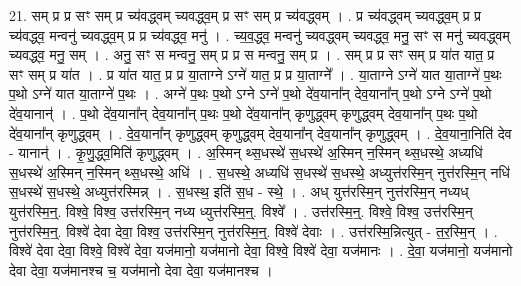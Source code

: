 \documentclass[17pt]{extarticle}
\begin{document}
21. सम् प्र प्र सꣳ सम् प्र च्य॑वद्ध्वम् च्यवद्ध्व॒म् प्र सꣳ सम् प्र च्य॑वद्ध्वम् । . प्र च्य॑वद्ध्वम् च्यवद्ध्व॒म् प्र प्र च्य॑वद्ध्व॒ मन्वनु॑ च्यवद्ध्व॒म् प्र प्र च्य॑वद्ध्व॒ मनु॑ । . च्य॒व॒द्ध्व॒ मन्वनु॑ च्यवद्ध्वम् च्यवद्ध्व॒ मनु॒ सꣳ स मनु॑ च्यवद्ध्वम् च्यवद्ध्व॒ मनु॒ सम् । . अनु॒ सꣳ स मन्वनु॒ सम् प्र प्र स मन्वनु॒ सम् प्र । . सम् प्र प्र सꣳ सम् प्र या॑त यात॒ प्र सꣳ सम् प्र या॑त । . प्र या॑त यात॒ प्र प्र या॒ताग्ने ऽग्ने॑ यात॒ प्र प्र या॒ताग्ने᳚ । . या॒ताग्ने ऽग्ने॑ यात या॒ताग्ने॑ प॒थः प॒थो ऽग्ने॑ यात या॒ताग्ने॑ प॒थः । . अग्ने॑ प॒थः प॒थो ऽग्ने ऽग्ने॑ प॒थो दे॑व॒याना᳚न् देव॒याना᳚न् प॒थो ऽग्ने ऽग्ने॑ प॒थो दे॑व॒यानान्॑ । . प॒थो दे॑व॒याना᳚न् देव॒याना᳚न् प॒थः प॒थो दे॑व॒याना᳚न् कृणुद्ध्वम् कृणुद्ध्वम् देव॒याना᳚न् प॒थः प॒थो दे॑व॒याना᳚न् कृणुद्ध्वम् । . दे॒व॒याना᳚न् कृणुद्ध्वम् कृणुद्ध्वम् देव॒याना᳚न् देव॒याना᳚न् कृणुद्ध्वम् । . दे॒व॒याना॒निति॑ देव - यानान्॑ । . कृ॒णु॒द्ध्व॒मिति॑ कृणुद्ध्वम् । . अ॒स्मिन् थ्स॒धस्थे॑ स॒धस्थे॑ अ॒स्मिन् न॒स्मिन् थ्स॒धस्थे॒ अध्यधि॑ स॒धस्थे॑ अ॒स्मिन् न॒स्मिन् थ्स॒धस्थे॒ अधि॑ । . स॒धस्थे॒ अध्यधि॑ स॒धस्थे॑ स॒धस्थे॒ अध्युत्त॑रस्मि॒न् नुत्त॑रस्मि॒न् नधि॑ स॒धस्थे॑ स॒धस्थे॒ 
अध्युत्त॑रस्मिन्न् । . स॒धस्थ॒ इति॑ स॒ध - स्थे॒ । . अध् युत्त॑रस्मि॒न् नुत्त॑रस्मि॒न् नध्यध् युत्त॑रस्मि॒न्॒. विश्वे॒ विश्व॒ उत्त॑रस्मि॒न् नध्य ध्युत्त॑रस्मि॒न्॒. विश्वे᳚ । . उत्त॑रस्मि॒न्॒. विश्वे॒ विश्व॒ उत्त॑रस्मि॒न् नुत्त॑रस्मि॒न्॒. विश्वे॑ देवा देवा॒ विश्व॒ उत्त॑रस्मि॒न् नुत्त॑रस्मि॒न्॒. विश्वे॑ देवाः । . उत्त॑रस्मि॒न्नित्युत् - त॒र॒स्मि॒न् । . विश्वे॑ देवा देवा॒ विश्वे॒ विश्वे॑ देवा॒ यज॑मानो॒ यज॑मानो देवा॒ विश्वे॒ विश्वे॑ देवा॒ यज॑मानः । . दे॒वा॒ यज॑मानो॒ यज॑मानो देवा देवा॒ यज॑मानश्च च॒ यज॑मानो देवा देवा॒ यज॑मानश्च । \newline
\end{document}
